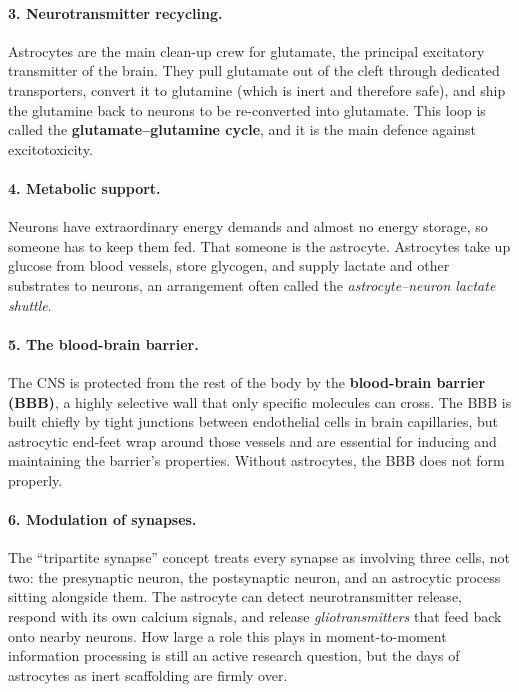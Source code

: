 \documentclass[11pt]{article}
\begin{document}
\paragraph{3. Neurotransmitter recycling.} Astrocytes are the main clean-up crew for glutamate, the principal excitatory transmitter of the brain. They pull glutamate out of the cleft through dedicated transporters, convert it to glutamine (which is inert and therefore safe), and ship the glutamine back to neurons to be re-converted into glutamate. This loop is called the \textbf{glutamate--glutamine cycle}, and it is the main defence against excitotoxicity.

\paragraph{4. Metabolic support.} Neurons have extraordinary energy demands and almost no energy storage, so someone has to keep them fed. That someone is the astrocyte. Astrocytes take up glucose from blood vessels, store glycogen, and supply lactate and other substrates to neurons, an arrangement often called the \textit{astrocyte--neuron lactate shuttle}.

\paragraph{5. The blood-brain barrier.} The CNS is protected from the rest of the body by the \textbf{blood-brain barrier (BBB)}, a highly selective wall that only specific molecules can cross. The BBB is built chiefly by tight junctions between endothelial cells in brain capillaries, but astrocytic end-feet wrap around those vessels and are essential for inducing and maintaining the barrier's properties. Without astrocytes, the BBB does not form properly.

\paragraph{6. Modulation of synapses.} The ``tripartite synapse'' concept treats every synapse as involving three cells, not two: the presynaptic neuron, the postsynaptic neuron, and an astrocytic process sitting alongside them. The astrocyte can detect neurotransmitter release, respond with its own calcium signals, and release \textit{gliotransmitters} that feed back onto nearby neurons. How large a role this plays in moment-to-moment information processing is still an active research question, but the days of astrocytes as inert scaffolding are firmly over.
\end{document}
